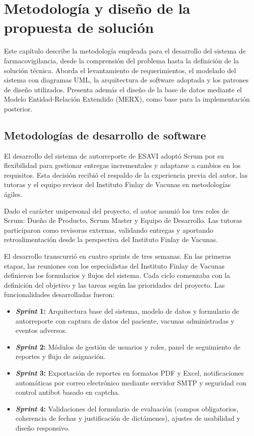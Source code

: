\chapter{Metodología y diseño de la propuesta de solución}\label{chapter:proposal}


Este capítulo describe la metodología empleada para el desarrollo del sistema de farmacovigilancia, desde la comprensión del problema hasta la definición de la solución técnica. 
Aborda el levantamiento de requerimientos, el modelado del sistema con diagramas UML, la arquitectura de software adoptada y los patrones de diseño utilizados. 
Presenta además el diseño de la base de datos mediante el Modelo Entidad-Relación Extendido (MERX), como base para la implementación posterior.

\section{Metodologías de desarrollo de software}
\label{section:metodologias_desarrollo}

El desarrollo del sistema de autorreporte de ESAVI adoptó Scrum por su flexibilidad para gestionar entregas incrementales y adaptarse a cambios en los requisitos.
Esta decisión recibió el respaldo de la experiencia previa del autor, las tutoras y el equipo revisor del Instituto Finlay de Vacunas en metodologías ágiles. 

Dado el carácter unipersonal del proyecto, el autor asumió los tres roles de Scrum: Dueño de Producto, Scrum Master y Equipo de Desarrollo. 
Las tutoras participaron como revisoras externas, validando entregas y aportando retroalimentación desde la perspectiva del Instituto Finlay de Vacunas.

El desarrollo transcurrió en cuatro sprints de tres semanas. 
En las primeras etapas, las reuniones con los especialistas del Instituto Finlay de Vacunas definieron los formularios y flujos del sistema.
Cada ciclo comenzaba con la definición del objetivo y las tareas según las prioridades del proyecto. 
Las funcionalidades desarrolladas fueron:

\begin{itemize}
    \item \textbf{\textit{Sprint} 1:} Arquitectura base del sistema, modelo de datos y formulario de autorreporte con captura de datos del paciente, vacunas administradas y eventos adversos.
    \item \textbf{\textit{Sprint} 2:} Módulos de gestión de usuarios y roles, panel de seguimiento de reportes y flujo de asignación.
    \item \textbf{\textit{Sprint} 3:} Exportación de reportes en formatos PDF y Excel, notificaciones automáticas por correo electrónico mediante servidor SMTP y seguridad con control antibot basado en captcha.
    \item \textbf{\textit{Sprint} 4:} Validaciones del formulario de evaluación (campos obligatorios, coherencia de fechas y justificación de dictámenes), ajustes de usabilidad y diseño responsivo.
\end{itemize}

